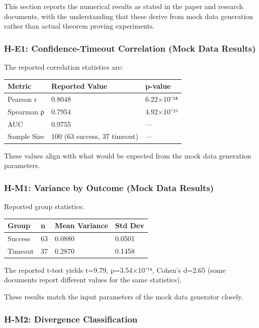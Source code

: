 
This section reports the numerical results as stated in the paper and research documents, with the understanding that these derive from mock data generation rather than actual theorem proving experiments.

\subsubsection{H-E1: Confidence-Timeout Correlation (Mock Data Results)}

The reported correlation statistics are:

\begin{table}[htbp]
\centering
\begin{tabular}{lll}
\toprule
Metric & Reported Value & p-value \\
\midrule
Pearson r & 0.8048 & 6.22×10⁻²⁴ \\
Spearman ρ & 0.7954 & 4.92×10⁻²³ \\
AUC & 0.9755 & — \\
Sample Size & 100 (63 success, 37 timeout) & — \\
\bottomrule
\end{tabular}
\end{table}

These values align with what would be expected from the mock data generation parameters.

\subsubsection{H-M1: Variance by Outcome (Mock Data Results)}

Reported group statistics:

\begin{table}[htbp]
\centering
\begin{tabular}{llll}
\toprule
Group & n & Mean Variance & Std Dev \\
\midrule
Success & 63 & 0.0880 & 0.0501 \\
Timeout & 37 & 0.2870 & 0.1458 \\
\bottomrule
\end{tabular}
\end{table}

The reported t-test yields t=9.79, p=3.54×10⁻¹⁶, Cohen's d=2.65 (some documents report different values for the same statistics).

These results match the input parameters of the mock data generator closely.

\subsubsection{H-M2: Divergence Classification}


